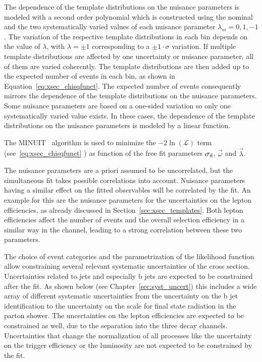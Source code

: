 The dependence of the template distributions on the nuisance parameters is modeled with a second order polynomial which is constructed using the nominal and the two systematically varied values of each nuisance parameter $\lambda_m=0, 1, -1$.
The variation of the respective template distributions in each bin depends on the value of $\lambda$, with $\lambda = \pm 1$ corresponding to a $ \pm 1 \cdot \sigma$ variation. If multiple template distributions are affected by one uncertainty or nuisance parameter, all of them are varied coherently.
The template distributions are then added up to the expected number of events in each bin, as shown in Equation~\ref{eq:xsec_chisqfunct}. The expected number of events consequently mirrors the dependence of the template distributions on the nuisance parameters.
Some nuisance parameters are based on a one-sided variation so only one systematically varied value exists. In these cases, the dependence of the template distributions on the nuisance parameters is modeled by a linear function.

The MINUIT~\cite{James:1975dr} algorithm is used to minimize the  $-2 \ln{(\mathcal{L})}$ term (see~\ref{eq:xsec_chisqfunct} ) as function of the free fit parameters $\sigma_\mathrm{t\bar{t}}$, $\vec{\omega}$
and $\vec{\lambda}$. 

The nuisance parameters are a priori assumed to be uncorrelated, but the simultaneous fit takes possible correlations into account. Nuisance parameters having a similar effect on the fitted observables will be correlated by the fit.
An example for this are the nuisance parameters for the uncertainties on the lepton efficiencies, as already discussed in Section~\ref{sec:xsec_templates}. Both lepton efficiencies affect the number of events and the overall selection efficiency in a similar way in the \emu channel, leading to a strong correlation between these two parameters.

The choice of event categories and the parametrization of the likelihood function allow constraining several relevant systematic uncertainties of the \ttbar cross section.
Uncertainties related to jets and especially b jets are expected to be constrained after the fit. As shown below (see Chapter~\ref{sec:syst_uncert}) this includes a wide array of different systematic uncertainties
from the uncertainty on the b jet identification to the uncertainty on the scale for final state radiation in the parton shower. The uncertainties on the lepton efficiencies are expected to be constrained as well, due to the separation into the three decay channels.
Uncertainties that change the normalization of all processes like the uncertainty on the trigger efficiency or the luminosity are not expected to be constrained by the fit.


